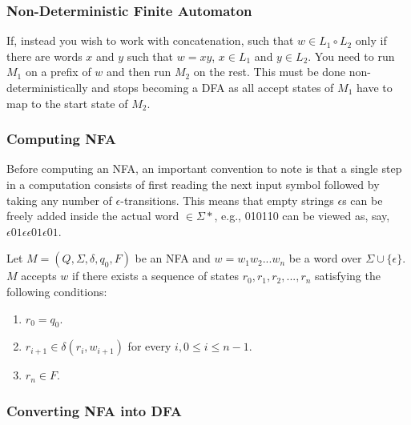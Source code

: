\subsubsection{Non-Deterministic Finite Automaton}

If, instead you wish to work with concatenation, such that \(w \in L_1 \circ L_2\) only if there are words \(x\) and \(y\) such that \(w=xy\), \(x \in L_1\) and \(y \in L_2\). You need to run \(M_1\) on a prefix of \(w\) and then run \(M_2\) on the rest. This must be done non-deterministically and stops becoming a DFA as all accept states of \(M_1\) have to map to the start state of \(M_2\).


\subsubsection*{Computing NFA}

Before computing an NFA, an important convention to note is that a single step in a computation consists of first reading the next input symbol followed by taking any number of \(\epsilon\)-transitions. This means that empty strings \(\epsilon\)s can be freely added inside the actual word \(\in \Sigma*\), e.g., 010110 can be viewed as, say, \(\epsilon 01 \epsilon\epsilon 01 \epsilon 01\).

Let \(M = (Q,\Sigma,\delta,q_0,F)\) be an NFA and \(w=w_1w_2...w_n\) be a word over \(\Sigma \cup \{\epsilon\}\). \(M\) accepts \(w\) if there exists a sequence of states \(r_0,r_1,r_2,...,r_n\) satisfying the following conditions:
\begin{enumerate}
    \item \(r_0 = q_0\).
    \item \(r_{i+1} \in \delta(r_i,w_{i+1})\) for every \(i, 0 \leq i \leq n-1\).
    \item \(r_n \in F\).
\end{enumerate}

\subsubsection{Converting NFA into DFA}

